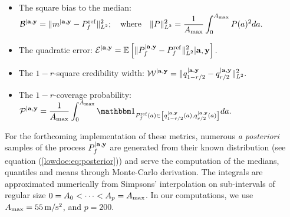     \begin{itemize}
        \item The square bias to the median: $\displaystyle{\mathcal{B}^{|\mathbf{a},\mathbf{y}} = \|m^{|\mathbf{a},\mathbf{y}}- P_f^{\mathrm{ref}}\|^2_{L^2};\quad \text{where}\quad\|P\|^2_{L^2} = \frac{1}{A_{\max}}\int_{0}^{A_{\max}}P(a)^2 d a.}$
        \item The quadratic error: $\displaystyle{\mathcal{E}^{|\mathbf{a},\mathbf{y}} = \mathbb{E}\left[\|P_f^{|\mathbf{a},\mathbf{y}}-P_f^{\mathrm{ref}} \|^2_{L^2}|\mathbf{a},\mathbf{y}\right].}$
        \item The $1-r$-square credibility width: $\displaystyle{\mathcal{W}^{|\mathbf{a},\mathbf{y}} = \|q_{1-{r/2}}^{|\mathbf{a},\mathbf{y}} - q_{{r/2}}^{|\mathbf{a},\mathbf{y}}\|_{L^2}^2  .}$
        \item The $1-r$-coverage probability: %
        $\displaystyle{\cP^{|\mbf a,\mbf y} = \frac{1}{A_{\max}}\int_0^{A_{\max}}\indic_{P_f^{\mathrm{ref}}(a)\in \left[q_{1-{r/2}}^{|\mbf a,\mbf y}(a), q_{{r/2}}^{|\mbf a,\mbf y}(a) \right] } d a.}$
    \end{itemize}
For the forthcoming implementation of these metrics, numerous \emph{a posteriori} samples of the process $P_f^{|\mathbf{a},\mathbf{y}}$ are generated from their known distribution (see equation (\ref{lowdoe:eq:posterior})) and serve the computation of the medians, quantiles and means through Monte-Carlo derivation. The integrals are approximated numerically from Simpsons' interpolation
{on sub-intervals of regular size  $0=A_0<\dots<A_p=A_{\rm max}$. In our computations, we use  $A_{\rm max}=55\,\mathrm{m/s^2}$, and $p=200$.}



